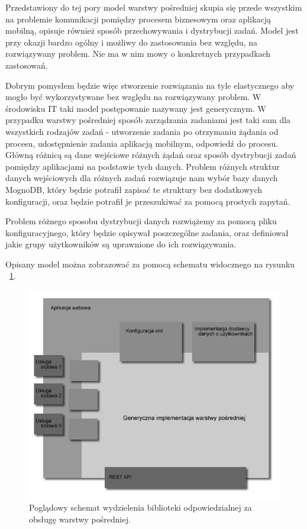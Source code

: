 Przedstawiony do tej pory model warstwy pośredniej skupia się przede wszystkim na problemie komunikacji pomiędzy procesem biznesowym oraz aplikacją mobilną, opisuje również sposób przechowywania i dystrybucji zadań. Model jest przy okazji bardzo ogólny i możliwy do zastosowania bez względu, na rozwiązywany problem. Nie ma w nim mowy o konkretnych przypadkach zastosowań. 

Dobrym pomysłem będzie więc stworzenie rozwiązania na tyle elastycznego aby mogło być wykorzystywane bez względu na rozwiązywany problem. W środowisku IT taki model postępowanie nazywany jest generycznym. W przypadku warstwy pośredniej sposób zarządzania zadaniami jest taki sam dla wszystkich rodzajów zadań - utworzenie zadania po otrzymaniu żądania od procesu, udostępnienie zadania aplikacją mobilnym, odpowiedź do procesu. Główną różnicą są dane wejściowe różnych żądań oraz sposób dystrybucji zadań pomiędzy aplikacjami na podstawie tych danych. Problem różnych struktur danych wejściowych dla różnych zadań rozwiązuje nam wybór bazy danych MognoDB, który będzie potrafił zapisać te struktury bez dodatkowych konfiguracji, oraz będzie potrafił je przeszukiwać za pomocą prostych zapytań. 

Problem różnego sposobu dystrybucji danych rozwiążemy za pomocą pliku konfiguracyjnego, który będzie opisywał poszczególne zadania, oraz definiował jakie grupy użytkowników są uprawnione do ich rozwiązywania.

Opisany model można zobrazować za pomocą schematu widocznego na rysunku ~\ref{fig:middlewareGenericConcept}.

\begin{figure}[h]
\centerline{\includegraphics[scale=0.6]{middlewareGenericConcept}}
\caption{Poglądowy schemat wydzielenia biblioteki odpowiedzialnej za obsługę warstwy pośredniej.}
\label{fig:middlewareGenericConcept}
\end{figure}

